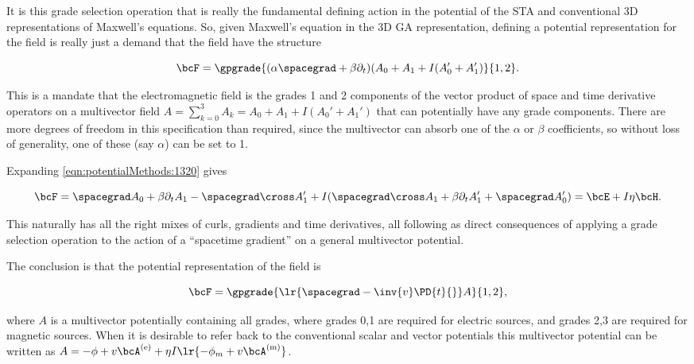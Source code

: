 It is this grade selection operation that is really the fundamental defining action in the potential of the STA and conventional 3D representations of Maxwell's equations.  So, given Maxwell's equation in the 3D GA representation, defining a potential representation for the field is really just a demand that the field have the structure

\begin{dmath}\label{eqn:potentialMethods:1320}
\bcF = \gpgrade{ (\alpha \spacegrad + \beta \partial_t)( A_0 + A_1 + I( A_0' + A_1' ) }{1,2}.
\end{dmath}

This is a mandate that the electromagnetic field is the grades 1 and 2 components of the vector product of space and time derivative operators on a multivector field \( A = \sum_{k=0}^3 A_k = A_0 + A_1 + I( A_0' + A_1' ) \) that can potentially have any grade components.  There are more degrees of freedom in this specification than required, since the multivector can absorb one of the \( \alpha \) or \( \beta \) coefficients, so without loss of generality, one of these (say \( \alpha\)) can be set to 1.

Expanding \cref{eqn:potentialMethods:1320} gives

\begin{dmath}\label{eqn:potentialMethods:1340}
\bcF
=
\spacegrad A_0
+ \beta \partial_t A_1
- \spacegrad \cross A_1'
+ I (\spacegrad \cross A_1
+ \beta \partial_t A_1'
+ \spacegrad A_0')
=
\bcE + I \eta \bcH.
\end{dmath}

This naturally has all the right mixes of curls, gradients and time derivatives, all following as direct consequences of applying a grade selection operation to the action of a ``spacetime gradient'' on a general multivector potential.

The conclusion is that the potential representation of the field is

\begin{dmath}\label{eqn:potentialMethods:1360}
\bcF =
\gpgrade{ \lr{ \spacegrad - \inv{v} \PD{t}{} } A }{1,2},
\end{dmath}

where \( A \) is a multivector potentially containing all grades, where grades 0,1 are required for electric sources, and grades 2,3 are required for magnetic sources.  When it is desirable to refer back to the conventional scalar and vector potentials this multivector potential can be written as \( A = -\phi + v \bcA^\e + \eta I \lr{ -\phi_m + v \bcA^\m } \).

